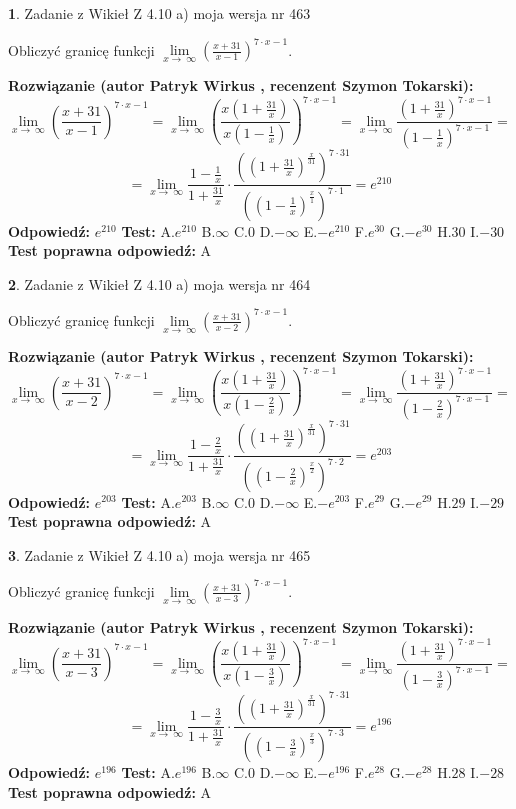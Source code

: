 \documentclass[12pt, a4paper]{article}
\theoremstyle{definition} %
\newtheorem{zad}{}
\newcommand{\zadStart}[1]{\begin{zad}#1\newline}
\newcommand{\zadStop}{\end{zad}}
\newcommand{\rozwStart}[2]{\noindent \textbf{Rozwiązanie (autor #1 , recenzent #2): }\newline}
\newcommand{\rozwStop}{\newline}
\newcommand{\odpStart}{\noindent \textbf{Odpowiedź:}\newline}
\newcommand{\odpStop}{\newline}
\newcommand{\testStart}{\noindent \textbf{Test:}\newline}
\newcommand{\testStop}{\newline}
\newcommand{\kluczStart}{\noindent \textbf{Test poprawna odpowiedź:}\newline}
\newcommand{\kluczStop}{\newline}
\begin{document}
\zadStart{Zadanie z Wikieł Z 4.10 a) moja wersja nr 463}

Obliczyć granicę funkcji  $\lim\limits_{x\to\ \infty}(\frac{x+31}{x-1})^{7\cdot x-1}$.
\zadStop
\rozwStart{Patryk Wirkus}{Szymon Tokarski}
$$\lim\limits_{x\to\ \infty}(\frac{x+31}{x-1})^{7\cdot x-1} = \lim\limits_{x\to\ \infty}(\frac{x(1+\frac{31}{x})}{x(1-\frac{1}{x})})^{7\cdot x-1}=\lim\limits_{x\to\ \infty}\frac{(1+\frac{31}{x})^{7\cdot x-1}}{(1-\frac{1}{x})^{7\cdot x-1}}=$$
$$=\lim\limits_{x\to\ \infty}\frac{1-\frac{1}{x}}{1+\frac{31}{x}}\cdot\frac{((1+\frac{31}{x})^{\frac{x}{31}})^{7\cdot31}}{((1-\frac{1}{x})^{\frac{x}{1}})^{7\cdot1}}=e^{210}$$
\rozwStop
\odpStart
$e^{210}$
\odpStop
\testStart
A.$e^{210}$ B.$\infty$ C.$0$ D.$-\infty$ E.$-e^{210}$
F.$e^{30}$ G.$-e^{30}$
H.$30$
I.$-30$
\testStop
\kluczStart
A
\kluczStop



\zadStart{Zadanie z Wikieł Z 4.10 a) moja wersja nr 464}

Obliczyć granicę funkcji  $\lim\limits_{x\to\ \infty}(\frac{x+31}{x-2})^{7\cdot x-1}$.
\zadStop
\rozwStart{Patryk Wirkus}{Szymon Tokarski}
$$\lim\limits_{x\to\ \infty}(\frac{x+31}{x-2})^{7\cdot x-1} = \lim\limits_{x\to\ \infty}(\frac{x(1+\frac{31}{x})}{x(1-\frac{2}{x})})^{7\cdot x-1}=\lim\limits_{x\to\ \infty}\frac{(1+\frac{31}{x})^{7\cdot x-1}}{(1-\frac{2}{x})^{7\cdot x-1}}=$$
$$=\lim\limits_{x\to\ \infty}\frac{1-\frac{2}{x}}{1+\frac{31}{x}}\cdot\frac{((1+\frac{31}{x})^{\frac{x}{31}})^{7\cdot31}}{((1-\frac{2}{x})^{\frac{x}{2}})^{7\cdot2}}=e^{203}$$
\rozwStop
\odpStart
$e^{203}$
\odpStop
\testStart
A.$e^{203}$ B.$\infty$ C.$0$ D.$-\infty$ E.$-e^{203}$
F.$e^{29}$ G.$-e^{29}$
H.$29$
I.$-29$
\testStop
\kluczStart
A
\kluczStop



\zadStart{Zadanie z Wikieł Z 4.10 a) moja wersja nr 465}

Obliczyć granicę funkcji  $\lim\limits_{x\to\ \infty}(\frac{x+31}{x-3})^{7\cdot x-1}$.
\zadStop
\rozwStart{Patryk Wirkus}{Szymon Tokarski}
$$\lim\limits_{x\to\ \infty}(\frac{x+31}{x-3})^{7\cdot x-1} = \lim\limits_{x\to\ \infty}(\frac{x(1+\frac{31}{x})}{x(1-\frac{3}{x})})^{7\cdot x-1}=\lim\limits_{x\to\ \infty}\frac{(1+\frac{31}{x})^{7\cdot x-1}}{(1-\frac{3}{x})^{7\cdot x-1}}=$$
$$=\lim\limits_{x\to\ \infty}\frac{1-\frac{3}{x}}{1+\frac{31}{x}}\cdot\frac{((1+\frac{31}{x})^{\frac{x}{31}})^{7\cdot31}}{((1-\frac{3}{x})^{\frac{x}{3}})^{7\cdot3}}=e^{196}$$
\rozwStop
\odpStart
$e^{196}$
\odpStop
\testStart
A.$e^{196}$ B.$\infty$ C.$0$ D.$-\infty$ E.$-e^{196}$
F.$e^{28}$ G.$-e^{28}$
H.$28$
I.$-28$
\testStop
\kluczStart
A
\kluczStop
\end{document}
